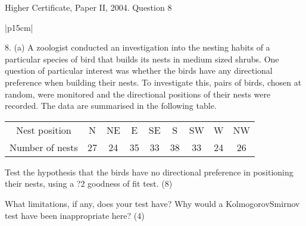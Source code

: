 \documentclass[a4paper,12pt]{article}
\begin{document}
Higher Certificate, Paper II, 2004. Question 8


\begin{table}[ht!]
 
\centering
 
\begin{tabular}{|p{15cm}|}
 
\hline  

8. (a) A zoologist conducted an investigation into the nesting habits of a particular species of bird that builds its nests in medium sized shrubs.  One question of particular interest was whether the birds have any directional preference when building their nests.  To investigate this, pairs of birds, chosen at random, were monitored and the directional positions of their nests were recorded.  The data are summarised in the following table. 
 
\begin{center}
\begin{tabular}{ccccccccc}
Nest position  &N & NE & E & SE & S & SW&  W&  NW  \\
Number of nests & 27&  24&  35&  33&  38&  33&  24&  26 \\ 
\end{tabular}
\end{center} 
Test the hypothesis that the birds have no directional preference in positioning their nests, using a ?2 goodness of fit test. (8) 
 
What limitations, if any, does your test have?  Why would a KolmogorovSmirnov test have been inappropriate here? (4) 
 
 

\\ \hline
  
\end{tabular}

\end{table} 
\end{document}
